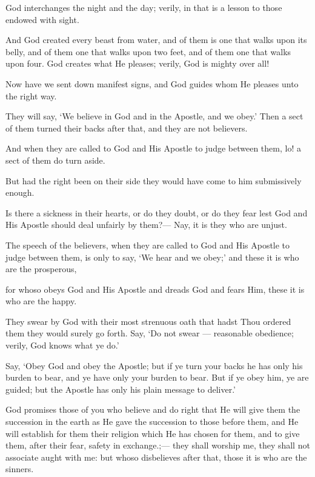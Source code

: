 \documentclass[fontsize=14pt, letterpaper, notitlepage, openany, DIV=12]{scrbook} %
\begin{document}
\noindent[24:44]
God interchanges the night and the day; verily, in that is a lesson to those endowed with
sight.

\noindent[24:45]
And God created every beast from water, and of them is one that walks upon its belly,
and of them one that walks upon two feet, and of them one that walks upon four. God creates
what He pleases; verily, God is mighty over all!

\noindent[24:46]
Now have we sent down manifest signs, and God guides whom He pleases unto the right
way.

\noindent[24:47]
They will say, `We believe in God and in the Apostle, and we obey.' Then a sect of them
turned their backs after that, and they are not believers.

\noindent[24:48]
And when they are called to God and His Apostle to judge between them, lo! a sect of
them do turn aside.

\noindent[24:49]
But had the right been on their side they would have come to him submissively enough.

\noindent[24:50]
Is there a sickness in their hearts, or do they doubt, or do they fear lest God and His
Apostle should deal unfairly by them?--- Nay, it is they who are unjust.

\noindent[24:51]
The speech of the believers, when they are called to God and His Apostle to judge
between them, is only to say, `We hear and we obey;' and these it is who are the prosperous,

\noindent[24:52]
for whoso obeys God and His Apostle and dreads God and fears Him, these it is who are
the happy.

\noindent[24:53]
They swear by God with their most strenuous oath that hadst Thou ordered them they
would surely go forth. Say, `Do not swear --- reasonable obedience; verily, God knows what ye
do.'

\noindent[24:54]
Say, `Obey God and obey the Apostle; but if ye turn your backs he has only his burden to
bear, and ye have only your burden to bear. But if ye obey him, ye are guided; but the Apostle
has only his plain message to deliver.'

\noindent[24:55]
God promises those of you who believe and do right that He will give them the
succession in the earth as He gave the succession to those before them, and He will establish for
them their religion which He has chosen for them, and to give them, after their fear, safety in
exchange.;--- they shall worship me, they shall not associate aught with me: but whoso
disbelieves after that, those it is who are the sinners.
\end{document}
